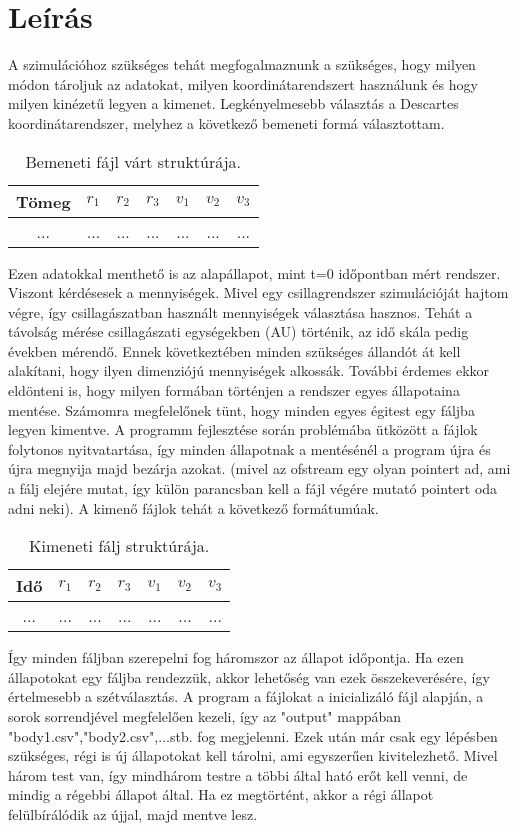 \section{Leírás}

A szimulációhoz szükséges tehát megfogalmaznunk a szükséges, hogy milyen módon tároljuk az adatokat, milyen koordinátarendszert használunk és hogy milyen kinézetű legyen a kimenet. Legkényelmesebb választás a Descartes koordinátarendszer, melyhez a következő bemeneti formá választottam.

\begin{table}[ht!]
    \centering
    \begin{tabular}{|c|c|c|c|c|c|c|}  \hline 
        Tömeg & $r_1$ & $r_2$ & $r_3$ & $v_1$ & $v_2$ & $v_3$  \\ \hline 
        ... & ... & ... & ... & ... & ... & ... \\  
    \end{tabular}
    \caption{Bemeneti fájl várt struktúrája.}
    \label{tab:input}
\end{table}
Ezen adatokkal menthető is az alapállapot, mint t=0 időpontban mért rendszer. Viszont kérdésesek a mennyiségek. Mivel egy csillagrendszer szimulációját hajtom végre, így csillagászatban használt mennyiségek választása hasznos. Tehát a távolság mérése csillagászati egységekben (AU) történik, az idő skála pedig években mérendő. Ennek következtében minden szükséges állandót át kell alakítani, hogy ilyen dimenziójú mennyiségek alkossák. 
További érdemes ekkor eldönteni is, hogy milyen formában történjen a rendszer egyes állapotaina mentése. Számomra megfelelőnek tünt, hogy minden egyes égitest egy fáljba legyen kimentve. A programm fejlesztése során problémába ütközött a fájlok folytonos nyitvatartása, így minden állapotnak a mentésénél a program újra és újra megnyija majd bezárja azokat. (mivel az ofstream egy olyan pointert ad, ami a fálj elejére mutat, így külön parancsban kell a fájl végére mutató pointert oda adni neki). A kimenő fájlok tehát a következő formátumúak.
\begin{table}[ht!]
    \centering
    \begin{tabular}{|c|c|c|c|c|c|c|}  \hline 
        Idő & $r_1$ & $r_2$ & $r_3$ & $v_1$ & $v_2$ & $v_3$  \\ \hline 
        ... & ... & ... & ... & ... & ... & ... \\  
    \end{tabular}
    \caption{Kimeneti fálj struktúrája.}
    \label{tab:output}
\end{table}
Így minden fáljban szerepelni fog háromszor az állapot időpontja. Ha ezen állapotokat egy fáljba rendezzük, akkor lehetőség van ezek összekeverésére, így értelmesebb a szétválasztás. A program a fájlokat a inicializáló fájl alapján, a sorok sorrendjével megfelelően kezeli, így az "output" mappában "body1.csv","body2.csv",...stb. fog megjelenni.
Ezek után már csak egy lépésben szükséges, régi is új állapotokat kell tárolni, ami egyszerűen kivitelezhető. Mivel három test van, így mindhárom testre a többi által ható erőt kell venni, de mindig a régebbi állapot által. Ha ez megtörtént, akkor a régi állapot felülbírálódik az újjal, majd mentve lesz.